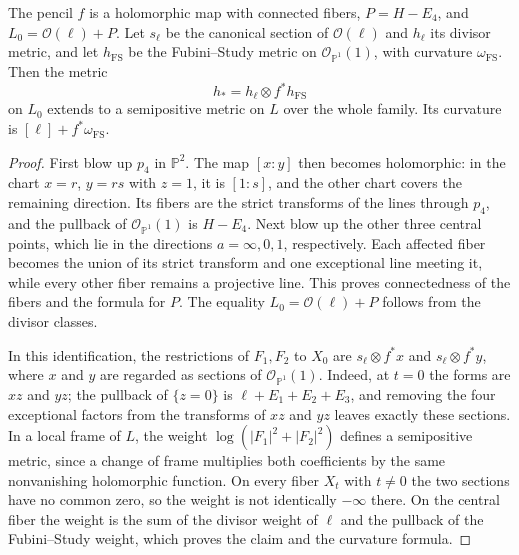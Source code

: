 \begin{lemma}\label{lem:four-point-pencil-reference}
The pencil $f$ is a holomorphic map with connected fibers, $P=H-E_4$, and $L_0=\mathcal O(\ell)+P$. Let $s_\ell$ be the canonical section of $\mathcal O(\ell)$ and $h_\ell$ its divisor metric, and let $h_{\mathrm{FS}}$ be the Fubini--Study metric on $\mathcal O_{\mathbb P^1}(1)$, with curvature $\omega_{\mathrm{FS}}$. Then the metric
\[
 h_*=h_\ell\otimes f^*h_{\mathrm{FS}}
\]
on $L_0$ extends to a semipositive metric on $L$ over the whole family. Its curvature is $[\ell]+f^*\omega_{\mathrm{FS}}$.
\end{lemma}
\begin{proof}
First blow up $p_4$ in $\mathbb P^2$. The map $[x:y]$ then becomes holomorphic: in the chart $x=r$, $y=rs$ with $z=1$, it is $[1:s]$, and the other chart covers the remaining direction. Its fibers are the strict transforms of the lines through $p_4$, and the pullback of $\mathcal O_{\mathbb P^1}(1)$ is $H-E_4$. Next blow up the other three central points, which lie in the directions $a=\infty,0,1$, respectively. Each affected fiber becomes the union of its strict transform and one exceptional line meeting it, while every other fiber remains a projective line. This proves connectedness of the fibers and the formula for $P$. The equality $L_0=\mathcal O(\ell)+P$ follows from the divisor classes.

In this identification, the restrictions of $F_1,F_2$ to $X_0$ are $s_\ell\otimes f^*x$ and $s_\ell\otimes f^*y$, where $x$ and $y$ are regarded as sections of $\mathcal O_{\mathbb P^1}(1)$. Indeed, at $t=0$ the forms are $xz$ and $yz$; the pullback of $\{z=0\}$ is $\ell+E_1+E_2+E_3$, and removing the four exceptional factors from the transforms of $xz$ and $yz$ leaves exactly these sections. In a local frame of $L$, the weight $\log(|F_1|^2+|F_2|^2)$ defines a semipositive metric, since a change of frame multiplies both coefficients by the same nonvanishing holomorphic function. On every fiber $X_t$ with $t\ne0$ the two sections have no common zero, so the weight is not identically $-\infty$ there. On the central fiber the weight is the sum of the divisor weight of $\ell$ and the pullback of the Fubini--Study weight, which proves the claim and the curvature formula.
\end{proof}


